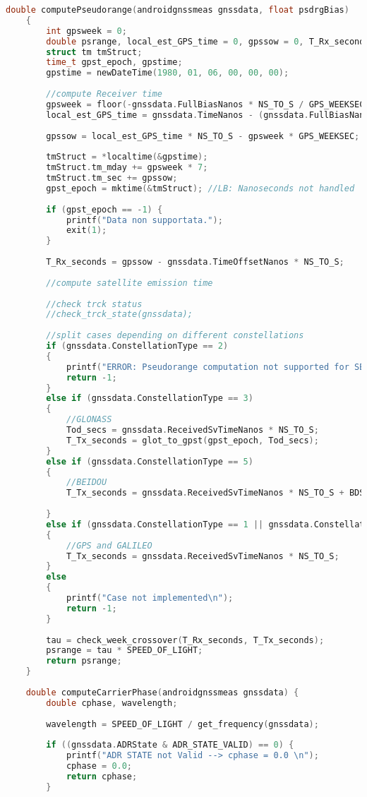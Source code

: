 \begin{lstlisting}[language=c]
	double computePseudorange(androidgnssmeas gnssdata, float psdrgBias)
	{
		int gpsweek = 0;
		double psrange, local_est_GPS_time = 0, gpssow = 0, T_Rx_seconds = 0, T_Tx_seconds = 0, tau = 0, Tod_secs = 0;
		struct tm tmStruct;
		time_t gpst_epoch, gpstime;
		gpstime = newDateTime(1980, 01, 06, 00, 00, 00);
		
		//compute Receiver time
		gpsweek = floor(-gnssdata.FullBiasNanos * NS_TO_S / GPS_WEEKSEC);
		local_est_GPS_time = gnssdata.TimeNanos - (gnssdata.FullBiasNanos + gnssdata.BiasNanos);
		
		gpssow = local_est_GPS_time * NS_TO_S - gpsweek * GPS_WEEKSEC;
		
		tmStruct = *localtime(&gpstime);
		tmStruct.tm_mday += gpsweek * 7;
		tmStruct.tm_sec += gpssow;
		gpst_epoch = mktime(&tmStruct); //LB: Nanoseconds not handled
		
		if (gpst_epoch == -1) {
			printf("Data non supportata.");
			exit(1);
		}
		
		T_Rx_seconds = gpssow - gnssdata.TimeOffsetNanos * NS_TO_S;
		
		//compute satellite emission time
		
		//check trck status
		//check_trck_state(gnssdata);
		
		//split cases depending on different constellations
		if (gnssdata.ConstellationType == 2)
		{
			printf("ERROR: Pseudorange computation not supported for SBAS\n");
			return -1;
		}
		else if (gnssdata.ConstellationType == 3)
		{
			//GLONASS
			Tod_secs = gnssdata.ReceivedSvTimeNanos * NS_TO_S;
			T_Tx_seconds = glot_to_gpst(gpst_epoch, Tod_secs);
		}
		else if (gnssdata.ConstellationType == 5)
		{
			//BEIDOU
			T_Tx_seconds = gnssdata.ReceivedSvTimeNanos * NS_TO_S + BDST_TO_GPST;
			
		}
		else if (gnssdata.ConstellationType == 1 || gnssdata.ConstellationType == 6)
		{
			//GPS and GALILEO
			T_Tx_seconds = gnssdata.ReceivedSvTimeNanos * NS_TO_S;
		}
		else
		{
			printf("Case not implemented\n");
			return -1;
		}
		
		tau = check_week_crossover(T_Rx_seconds, T_Tx_seconds);
		psrange = tau * SPEED_OF_LIGHT;
		return psrange;
	}
	
	double computeCarrierPhase(androidgnssmeas gnssdata) {
		double cphase, wavelength;
		
		wavelength = SPEED_OF_LIGHT / get_frequency(gnssdata);
		
		if ((gnssdata.ADRState & ADR_STATE_VALID) == 0) {
			printf("ADR STATE not Valid --> cphase = 0.0 \n");
			cphase = 0.0;
			return cphase;
		}
		

\end{lstlisting}
